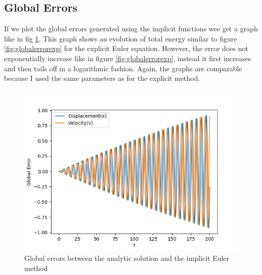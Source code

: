 \documentclass{article}
\begin{document}
\subsection{Global Errors}
If we plot the global errors generated using the implicit functions wee get a graph like in fig \ref{fig:globalerrorimp}. This graph shows an evolution of total energy similar to figure \ref{fig:globalerrorexp} for the explicit Euler equation. However, the error does not exponentially increase like in figure \ref{fig:globalerrorexp}, instead it first increases and then tails off in a logarithmic fashion. Again, the graphs are comparable because I used the same parameters as for the explicit method.
\begin{figure}[h]
    \centering
    \includegraphics[width = \textwidth]{Images/globalerrorimp.png}
    \caption{Global errors between the analytic solution and the implicit Euler method}
    \label{fig:globalerrorimp}
\end{figure}
\end{document}
